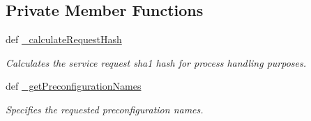 \subsection*{Private Member Functions}
\begin{DoxyCompactItemize}
\item 
def \hyperlink{classrapp__speech__detection__sphinx4_1_1speech__recognition__sphinx4__handler__node_1_1SpeechRecognitionSphinx4HandlerNode_ab0aee24f2a30e54932d173dbfe4063aa}{\-\_\-calculate\-Request\-Hash}
\begin{DoxyCompactList}\small\item\em Calculates the service request sha1 hash for process handling purposes. \end{DoxyCompactList}\item 
def \hyperlink{classrapp__speech__detection__sphinx4_1_1speech__recognition__sphinx4__handler__node_1_1SpeechRecognitionSphinx4HandlerNode_a0c7361126cde2b0e291506310ac022f5}{\-\_\-get\-Preconfiguration\-Names}
\begin{DoxyCompactList}\small\item\em Specifies the requested preconfiguration names. \end{DoxyCompactList}\end{DoxyCompactItemize}
